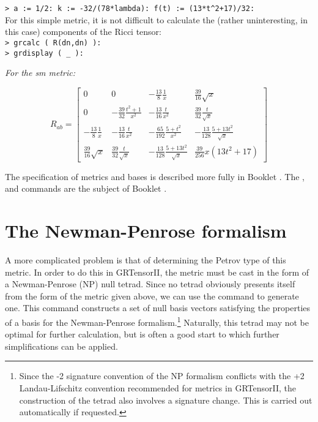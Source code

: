 \documentclass{article}
\begin{document}
{\noindent\texttt{> a := 1/2: k := -32/(78*lambda):
  f(t) := (13*t\^{}2+17)/32:}\\

\noindent For this simple metric, it is not difficult to calculate the
(rather uninteresting, in this case) components of the Ricci tensor:\\

\noindent\texttt{> grcalc ( R(dn,dn) ):}\\
\noindent\texttt{> grdisplay ( \_ ):}
\begin{center}{\em For the sm metric:}\end{center}
\[
  R_{ab} = \left[
    \begin{array}{cccc}
      0 & 0 & -\frac{13}{8}\frac{1}{x} & \frac{39}{16}\sqrt{x} \\
      0 & - \frac{39}{32}\frac{t^2+1}{x^2} & -\frac{13}{16}\frac{t}{x^2} &
        \frac{39}{32}\frac{t}{\sqrt{x}} \\
        -\frac{13}{8}\frac{1}{x} & -\frac{13}{16}\frac{t}{x^2} &
      -\frac{65}{192}\frac{5+t^2}{x^2} & 
        -\frac{13}{128}\frac{5+13t^2}{\sqrt{x}} \\
      \frac{39}{16}\sqrt{x} & \frac{39}{32}\frac{t}{\sqrt{x}} &
        -\frac{13}{128}\frac{5+13t^2}{\sqrt{x}} &
        \frac{39}{256}x(13t^2+17)
    \end{array}
    \right]
\]

The specification of metrics and bases is described more fully in Booklet
\grMakegRef. The ,  and 
commands are the subject of Booklet \grCalcRef.
%
\section{The Newman-Penrose formalism}
A more complicated problem is that of determining the Petrov type of
this metric. In order to do this in GRTensorII, the metric must be
cast in the form of a Newman-Penrose (NP) null tetrad. Since no tetrad
obviously presents itself from the form of the metric given above, we
can use the command  to generate one. This command
constructs a set of null basis vectors satisfying the properties of
a basis for the Newman-Penrose formalism.\footnote{Since the -2 signature
convention of the NP formalism conflicts with the +2 Landau-Lifschitz
convention recommended for metrics in GRTensorII, the construction
of the tetrad also involves a signature change. This is carried out
automatically if requested.}  Naturally, this tetrad
may not be optimal for further calculation, but is often a good start
to which further simplifications can be applied.\\

}
\end{document}

